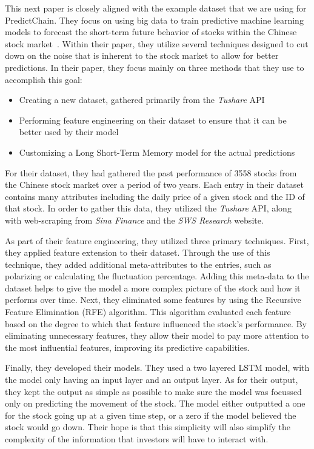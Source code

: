 \documentclass{article}
\begin{document}
    This next paper is closely aligned with the example dataset that we are using for PredictChain.  They focus on
    using big data to train predictive machine learning models to forecast the short-term future behavior of stocks
    within the Chinese stock market~\cite{deepPrediction}.  Within their paper, they utilize several techniques designed
    to cut down on the noise that is inherent to the stock market to allow for better predictions.  In their paper,
    they focus mainly on three methods that they use to accomplish this goal:

    \begin{itemize}
        \item Creating a new dataset, gathered primarily from the \textit{Tushare} API
        \item Performing feature engineering on their dataset to ensure that it can be better used by their model
        \item Customizing a Long Short-Term Memory model for the actual predictions
    \end{itemize}

    For their dataset, they had gathered the past performance of 3558 stocks from the Chinese stock market over
    a period of two years.  Each entry in their dataset contains many attributes including the daily price of a
    given stock and the ID of that stock.  In order to gather this data, they utilized the \textit{Tushare} API, along
    with web-scraping from \textit{Sina Finance} and the \textit{SWS Research} website.

    As part of their feature engineering, they utilized three primary techniques.  First, they applied feature extension
    to their dataset.  Through the use of this technique, they added additional meta-attributes to the entries, such
    as polarizing or calculating the fluctuation percentage.  Adding this meta-data to the dataset helps to give the model
    a more complex picture of the stock and how it performs over time.  Next, they eliminated some features by using the
    Recursive Feature Elimination (RFE) algorithm.  This algorithm evaluated each feature based on the degree to which
    that feature influenced the stock's performance.  By eliminating unnecessary features, they allow their model to
    pay more attention to the most influential features, improving its predictive capabilities.

    Finally, they developed their models.  They used a two layered LSTM model, with the model only having an input layer
    and an output layer.  As for their output, they kept the output as simple as possible to make sure the model
    was focussed only on predicting the movement of the stock.  The model either outputted a one for the stock going up at
    a given time step, or a zero if the model believed the stock would go down.  Their hope is that this simplicity
    will also simplify the complexity of the information that investors will have to interact with.
\end{document}
